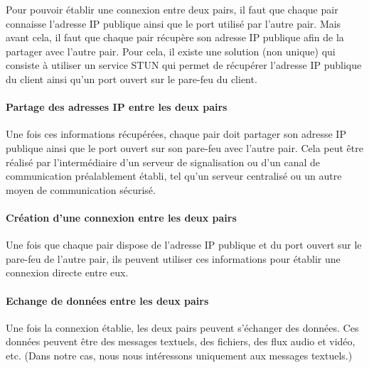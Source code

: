 Pour pouvoir établir une connexion entre deux pairs, il faut que chaque pair connaisse l'adresse IP publique ainsi que le port utilisé par l'autre pair. Mais avant cela, il faut que chaque pair récupère son adresse IP publique afin
de la partager avec l'autre pair. Pour cela, il existe une solution (non unique) qui consiste à utiliser un service STUN qui permet de récupérer l'adresse IP publique du client ainsi qu'un port ouvert sur le pare-feu du client.

\paragraph{Partage des adresses IP entre les deux pairs}

Une fois ces informations récupérées, chaque pair doit partager son adresse IP publique ainsi que le port ouvert sur son pare-feu avec l'autre pair. Cela peut être réalisé par l'intermédiaire d'un serveur de signalisation 
ou d'un canal de communication préalablement établi, tel qu'un serveur centralisé ou un autre moyen de communication sécurisé.

\paragraph{Création d'une connexion entre les deux pairs}

Une fois que chaque pair dispose de l'adresse IP publique et du port ouvert sur le pare-feu de l'autre pair, ils peuvent utiliser ces informations pour établir une connexion directe entre eux. 

\paragraph{Echange de données entre les deux pairs}

Une fois la connexion établie, les deux pairs peuvent s'échanger des données. Ces données peuvent être des messages textuels, des fichiers, des flux audio et vidéo, etc.
(Dans notre cas, nous nous intéressons uniquement aux messages textuels.)

